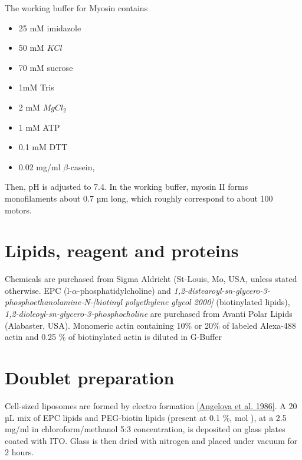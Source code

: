 \documentclass[A4paperpaper,11pt,english]{sphinxmanual}
\begin{document}
The working buffer for Myosin contains
\begin{itemize}
\item {} 
25 mM imidazole

\item {} 
50 mM \(KCl\)

\item {} 
70 mM sucrose

\item {} 
1mM Tris

\item {} 
2 mM \(MgCl_2\)

\item {} 
1 mM ATP

\item {} 
0.1 mM DTT

\item {} 
0.02 mg/ml \(\beta\)-casein,

\end{itemize}

Then,  pH is adjusted to 7.4.
In the working buffer, myosin II
forms monofilaments about 0.7 µm long, which roughly correspond to about 100
motors.


\section{Lipids, reagent and proteins}
\label{index-latex:lipids-reagent-and-proteins}
Chemicals are purchased from Sigma Aldricht (St-Louis, Mo, USA, unless stated otherwise.
EPC (l-\(\alpha\)-phosphatidylcholine) and \emph{1,2-distearoyl-sn-glycero-3-phosphoethanolamine-N-{[}biotinyl polyethylene glycol 2000{]}}
(biotinylated lipids), \emph{1,2-dioleoyl-sn-glycero-3-phosphocholine} are purchased from Avanti Polar Lipids (Alabaster, USA).
Monomeric actin containing 10\% or 20\% of labeled Alexa-488
actin and 0.25 \% of biotinylated actin is diluted in G-Buffer


\section{Doublet preparation}
\label{index-latex:electroformation}\label{index-latex:doublet-preparation}
Cell-sized liposomes are formed by electro formation {\hyperref[index-latex:angelova1986]{{[}Angelova et al. 1986{]}}}.
A 20 µL mix of EPC lipids and PEG-biotin lipids (present at 0.1 \%, mol ),
at a 2.5 mg/ml in chloroform/methanol 5:3 concentration, is deposited on glass
plates coated with  ITO. Glass is then dried with  nitrogen and placed
under vacuum for 2 hours.
\end{document}
